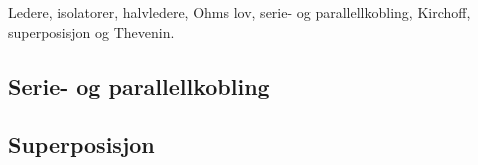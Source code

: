 Ledere, isolatorer, halvledere, Ohms lov, serie- og parallellkobling, Kirchoff, superposisjon og Thevenin.

\subsection{Serie- og parallellkobling}


\subsection{Superposisjon}

